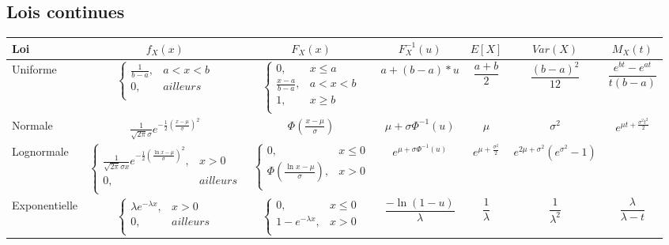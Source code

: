 \documentclass[10pt, french]{article}
\begin{document}
\subsection{Lois continues}
\begin{tabularx}{\textwidth}{ | Y | c | c | c | c | c | c  |}
\hline
  \textbf{Loi} & $f_X(x)$  & $F_X (x)$ & $F_X^{-1}(u)$ & $E[X]$ & $Var(X)$ & $M_X(t)$ \\
\hline
\hline

  Uniforme & $
    \left\{
    	\begin{array}{ll}
    		\frac{1}{b - a}, &  a < x < b \\
    		0,  &  ailleurs \\
    	\end{array}
    \right.
    $ & $
	\left\{
    	\begin{array}{ll}
		0, & x \le a \\
		\frac{x - a}{b - a }, &  a < x < b \\
    		1,  &  x \ge b \\
    	\end{array}
    \right.$
	& $ a + (b -a) * u$
	& $\dfrac{a+b}{2}$
	& $\dfrac{(b-a)^2}{12}$
	& $\dfrac{e^{bt} - e^{at}}{t(b -a)}$ \\ 
\hline

Normale  
 & $\frac{1}{\sqrt{2 \pi} \sigma} e^{-\frac{1}{2} \left(\frac{x-\mu}{\sigma}\right)^2} $ &
$\Phi\left(\frac{x-\mu}{\sigma}\right)$ &
$\mu +\sigma \Phi^{-1}(u)$ &
$\mu$ &
$\sigma^2$ &
$e^{\mu t + \frac{\sigma^2 t^2}{2}} $ \\
\hline

Lognormale & $
    \left\{
    	\begin{array}{ll}
    		\frac{1}{\sqrt{2 \pi} \sigma x} e^{-\frac{1}{2} \left(\frac{\ln x-\mu}{\sigma}\right)^2}, &  x > 0 \\
    		0,  &  ailleurs \\
    	\end{array}
    \right.
    $ & $  
	\left\{
    	\begin{array}{ll}
		0, & x \le 0 \\
		\Phi\left(\frac{\ln x-\mu}{\sigma}\right), &  x > 0\\
    	\end{array}
    \right.
 $ &
$e^{\mu +\sigma \Phi^{-1}(u)}$ &
$e^{\mu + \frac{\sigma^2}{2}} $ &
$e^{2 \mu + \sigma^2}\left(e^{\sigma^2}-1\right)$ & \\
\hline

Exponentielle & $
 \left\{
    	\begin{array}{ll}
    		\lambda e^{-\lambda x}, &  x > 0 \\
    		0,  &  ailleurs \\
    	\end{array}
    \right.
    $& $
	\left\{
    	\begin{array}{ll}
		0, & x \le 0 \\
		1 - e^{-\lambda x}, &  x > 0 \\
    	\end{array}
    \right.$
	& $ \dfrac{-\ln (1-u)}{\lambda}$
	& $\dfrac{1}{\lambda}$
	& $\dfrac{1}{\lambda^2}$
	& $\dfrac{\lambda}{\lambda - t}$ \\ 
\hline


\end{tabularx}
\end{document}
